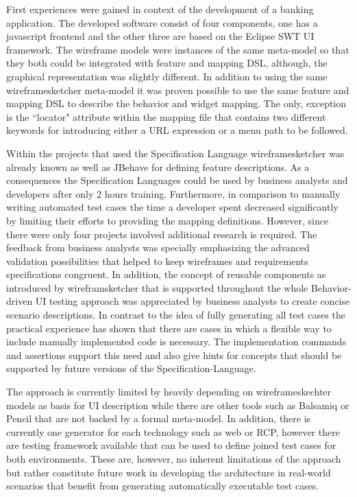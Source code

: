 \documentclass{sig-alternate-05-2015}
\begin{document}

First experiences were gained in context of the development of a banking application. 
The developed software consist of four components, one has a javascript frontend and the other three are based on the Eclipse SWT UI framework.
The wireframe models were instances of the same meta-model so that they both could be integrated with feature and mapping DSL, although, the graphical representation was slightly different.
In addition to using the same wireframesketcher meta-model it was proven possible to use the same feature and mapping DSL to describe the behavior and widget mapping.
The only, exception is the ``locator" attribute within the mapping file that contains two different keywords for introducing either a URL expression or a menu path to be followed.

Within the projects that used the Specification Language wireframesketcher was already known as well as JBehave for defining feature descriptions.
As a consequences the Specification Languages could be used by business analysts and developers after only 2 hours training.
Furthermore, in comparison to manually writing automated test cases the time a developer spent decreased significantly by limiting their efforts to providing the mapping definitions.
However, since there were only four projects involved additional research is required.
The feedback from business analysts was specially emphasizing the advanced validation possibilities that helped to keep wireframes and requirements specifications congruent.
In addition, the concept of reusable components as introduced by wireframsketcher that is supported throughout the whole Behavior-driven UI testing approach was appreciated by business analysts to create concise scenario descriptions.
In contrast to the idea of fully generating all test cases the practical experience has shown that there are cases in which a flexible way to include manually implemented code is necessary. 
The implementation commands and assertions support this need and also give hints for concepts that should be supported by future versions of the Specification-Language.

The approach is currently limited by heavily depending on wireframeskechter models as basis for UI description while there are other tools such as Balsamiq or Pencil that are not backed by a formal meta-model.
In addition, there is currently one generator for each technology such as web or RCP, however there are testing framework available that can be used to define joined test cases for both environments.
These are, however, no inherent limitations of the approach but rather constitute future work in developing the architecture in real-world scenarios that benefit from generating automatically executable test cases.
\end{document}
